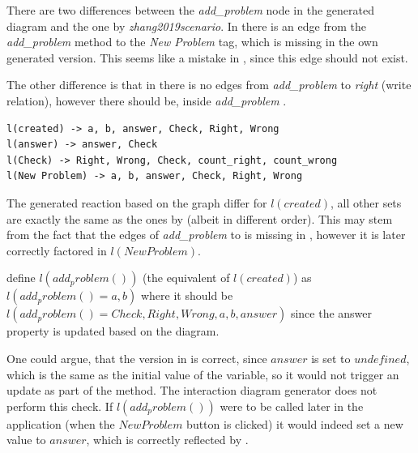 There are two differences between the \textit{add\_problem} node in the generated diagram and the one by \textit{zhang2019scenario}.
In \textcite{zhang2019scenario} there is an edge from
the \textit{add\_problem} method to the \textit{New Problem} tag, which is missing in the own generated version. This seems like a mistake in \parencite{zhang2019scenario}, since this edge should not exist.

The other difference is that in \parencite{zhang2019scenario} there is no edges from \textit{add\_problem} to \textit{right} (write relation), however there should be, 
inside \textit{add\_problem} .

\begin{lstlisting}
l(created) -> a, b, answer, Check, Right, Wrong
l(answer) -> answer, Check
l(Check) -> Right, Wrong, Check, count_right, count_wrong
l(New Problem) -> a, b, answer, Check, Right, Wrong
\end{lstlisting}

The generated reaction based on the graph differ for $l(created)$, all other sets are exactly the same as the ones by \textcite{zhang2019scenario} (albeit in different order). This may stem from the fact that the edges of \textit{add\_problem} to  is missing in \parencite{zhang2019scenario}, however it is later correctly factored in $l(New Problem)$.

\textcite{zhang2019scenario} define $l(add_problem())$ 
(the equivalent of $l(created)$) as $l(add_problem() = 
{a, b})$ where it should be 
$l(add_problem() = {Check, Right, Wrong, a, b, answer })$ since the answer property is updated based on the diagram. 

One could argue, that the version in \parencite{zhang2019scenario} is correct, since $answer$ is set to $undefined$, which is the same as the initial value of the variable, so it would not trigger an update as part of the  method. The interaction diagram generator does not perform this check. If $l(add_problem())$ were to be called later in the application (when the $New Problem$ button is clicked) it would indeed set a new value to $answer$, which is correctly reflected by \textcite{zhang2019scenario}.

